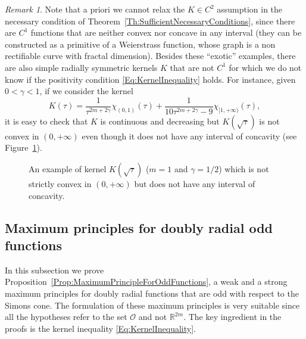 \documentclass[12pt,reqno]{amsart}
\theoremstyle{definition}
\theoremstyle{remark}
\newtheorem{remark}[theorem]{Remark}
\newcommand{\con}[1]{\mathbb{#1}}
\newcommand{\R}{\con{R}} %
\newcommand{\ocal}{\mathcal{O}}
\newcommand{\s}{\gamma}
\numberwithin{equation}{section}
\begin{document}
	\begin{remark}
		Note that a priori we cannot relax the $K\in C^2$ assumption in the necessary condition of Theorem~\ref{Th:SufficientNecessaryConditions}, since there are $C^1$ functions that are neither convex nor concave in any interval (they can be constructed as a primitive of a Weierstrass function, whose graph is a non rectifiable curve with fractal dimension). Besides these ``exotic'' examples, there are also simple radially symmetric kernels $K$ that are not $C^1$ for which we do not know if the positivity condition \eqref{Eq:KernelInequality} holds. For instance, given $0<\s<1$, if we consider the kernel
		$$ K(\tau) = \frac{1}{\tau^{2m+2\s}} \chi_{(0,1)}(\tau)+\frac{1}{10\tau^{2m+2\s}-9} \chi_{[1,+\infty)}(\tau), $$
		it is easy to check that $K$ is continuous and decreasing but $K(\sqrt{\tau})$ is not convex in $(0,+\infty)$ even though it does not have any interval of concavity (see Figure~\ref{Fig:Grafica}).
		\begin{figure}
			\centering
			\caption{An example of kernel $K(\sqrt{\tau})$ ($m=1$ and $\s=1/2$) which is not strictly convex in $(0,+\infty)$ but does not have any interval of concavity. }
			\label{Fig:Grafica}
		\end{figure}
	\end{remark}
	
	
	
	\subsection{Maximum principles for doubly radial odd functions}
	
	In this subsection we prove Proposition~\ref{Prop:MaximumPrincipleForOddFunctions}, a weak and a strong maximum principles for doubly radial functions that are odd with respect to the Simons cone. The formulation of these maximum principles is very suitable since all the hypotheses refer to the set $\ocal$ and not $\R^{2m}$. The key ingredient in the proofs is the kernel inequality \eqref{Eq:KernelInequality}.
	
\end{document}
